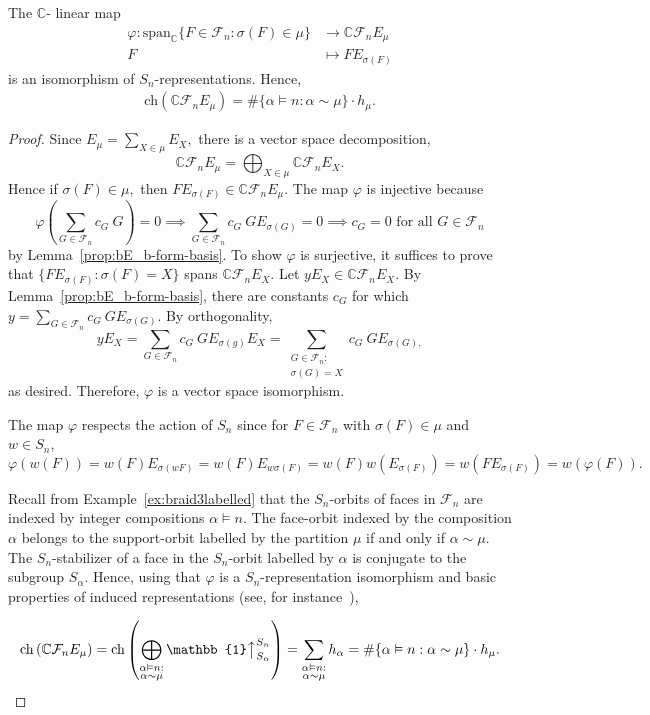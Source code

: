 \documentclass[ALCO, Unicode]{cedram}
\def\ch{\mathrm{ch}}
\def\C{{\mathbb{C}}}
\def\ch{\mathrm{ch}}
\begin{document}
\begin{lemma}\label{prop:decomposing-monoid-algebra} The $\C$- linear map 
\begin{align*}
    \varphi: \mathrm{span}_\C \{F \in \mathcal{F}_n: \sigma(F) \in \mu\} &\longrightarrow \C \mathcal{F}_n E_\mu\\
    F &\mapsto FE_{\sigma(F)}
\end{align*}
is an isomorphism of $S_n$-representations. Hence,  \begin{align*}
   \ch \left( \C \mathcal{F}_n E_{\mu}\right)  = \# \{\alpha \vDash n: \alpha \sim \mu \}\cdot h_\mu.
\end{align*}
\end{lemma}
\begin{proof} 
Since $E_\mu = \sum_{X \in \mu} E_X,$ there is a vector space decomposition, \[\C \mathcal{F}_n E_\mu = \bigoplus_{X \in \mu} \C \mathcal{F}_n E_X.\] Hence if $\sigma(F) \in \mu,$ then $FE_{\sigma(F)} \in \C \mathcal{F}_n E_\mu.$ The map $\varphi$ is injective because \[\varphi \left(\sum_{G \in \mathcal{F}_n}c_G \  G\right) = 0 \implies \sum_{G \in \mathcal{F}_n}c_G \  GE_{\sigma(G)} = 0 \implies c_G = 0 \text{ for all }G \in \mathcal{F}_n\] by Lemma~\ref{prop:bE_b-form-basis}. To show $\varphi$ is surjective, it suffices to prove that \mbox{$\{FE_{\sigma(F)}: \sigma(F) = X\}$} spans $\C \mathcal{F}_n E_X.$ Let $yE_X \in \C\mathcal{F}_n E_X.$ By Lemma~\ref{prop:bE_b-form-basis}, there are constants $c_G$ for which $y = \sum_{G \in \mathcal{F}_n}c_G \ GE_{\sigma(G)}.$ By orthogonality, 
\[yE_X = \sum_{G \in \mathcal{F}_n}c_G \ GE_{\sigma(g)}E_X = \sum_{\substack{G \in \mathcal{F}_n:\\ \sigma(G) = X}} c_G \  G E_{\sigma(G),}\]
as desired. Therefore, $\varphi$ is a vector space isomorphism.

The map $\varphi$ respects the action of $S_n$ since for $F \in \mathcal{F}_n$ with $\sigma(F) \in \mu$ and $w \in S_n$,
 \[\varphi(w(F)) \! =  w(F) E_{\sigma(w F)} \! = w(F) E_{w \sigma(F)} \! = w(F)w \left(E_{\sigma(F)}\right) \! = w \left(FE_{\sigma(F)}\right) \! = w\left( \varphi(F)\right).\] 

Recall from Example~\ref{ex:braid3labelled} that the $S_n$-orbits of faces in  $\mathcal{F}_n$ are indexed by integer compositions $\alpha \vDash n.$ The face-orbit indexed by the composition $\alpha$ belongs to the support-orbit labelled by the partition $\mu$ if and only if $\alpha \sim \mu.$ The $S_n$-stabilizer of a face in the $S_n$-orbit labelled by $\alpha$ is conjugate to the subgroup $S_\alpha$. Hence, using that $\varphi$ is a $S_n$-representation isomorphism and basic properties of induced representations (see, for instance~\cite[Proposition 4.3.2]{webbrepntheory}),

\begin{align*}
   \ch \left( \C \mathcal{F}_n E_\mu\right) = \ch \left(\bigoplus_{\substack{\alpha \vDash n:\\ \alpha \sim \mu}} \mathbb{1} \big \uparrow_{S_\alpha}^{S_n}\right) = \sum_{\substack{\alpha \vDash n:\\ \alpha \sim \mu}} h_\alpha = \# \{\alpha \vDash n: \alpha \sim \mu\}\cdot h_\mu.
\end{align*}
\end{proof}
\end{document}

